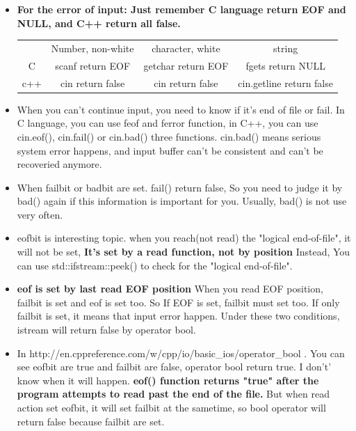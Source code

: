 \documentclass[a4paper,11pt,twoside]{book}
\renewcommand{\hline}{}
\begin{document}
\begin{itemize}
	\item \textbf{For the error of input: Just remember C language return EOF and NULL, and C++ return all false. }
	
	\begin{tabular}{|c|c|c|c|}
		\hline
		& Number, non-white & character, white  & string \\
		\hline
		C & scanf return EOF & getchar return EOF & fgets return NULL \\
		\hline
		c++ & cin return false & cin return false & cin.getline return false \\
		\hline
	\end{tabular}
	
	\item When you can't continue input, you need to know if it's end of file or fail. In C language, you can use feof and ferror function, in C++, you can use cin.eof(), cin.fail() or cin.bad() three functions. cin.bad() means serious system error happens, and input buffer can't be consistent and can't be recoveried anymore.
	
	\item When failbit or badbit are set. fail() return false, So you need to judge it by bad() again if this information is important for you.  Usually, bad() is not use very often.
	
	\item eofbit is interesting topic. when you reach(not read) the "logical end-of-file", it will not be set, \textbf{It's set by a read function, not by position}   Instead,  You can use std::ifstream::peek() to check for the "logical end-of-file".
	
	\item \textbf{eof is set by last read EOF position} When you read EOF position, failbit is set and eof is set too. So If EOF is set, failbit must set too.  If only failbit is set, it means that input error happen.  Under these two conditions, istream will return false by operator bool.
	
	\item In http://en.cppreference.com/w/cpp/io/basic\_ios/operator\_bool . You can see eofbit are true and failbit are false, operator bool return true. I don't' know when it will happen. \textbf{ eof() function returns "true" after the program attempts to read past the end of the file.}  But when read action set eofbit, it will set failbit at the sametime, so bool operator will return false because failbit are set.
	

\end{itemize}
\end{document}

